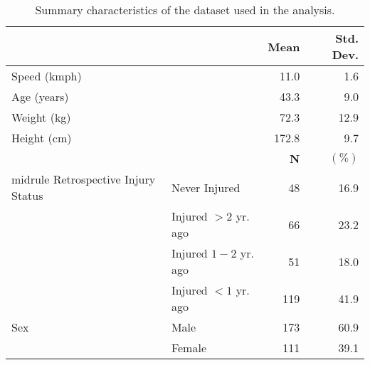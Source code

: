 \begin{table}
\centering
\begin{tabular}[t]{llrr}
\toprule
  &    & \textbf{Mean} & \textbf{Std. Dev.}\\
\midrule
Speed (kmph) &  & 11.0 & 1.6\\
Age (years) &  & 43.3 & 9.0\\
Weight (kg) &  & 72.3 & 12.9\\
Height (cm) &  & 172.8 & 9.7\\
\midrule
 &  & \textbf{N} & $\mathbf{(\%)}$\\
midrule
Retrospective Injury Status & Never Injured & 48 & 16.9\\
 & Injured $>2$ yr. ago & 66 & 23.2\\
 & Injured $1-2$ yr. ago & 51 & 18.0\\
 & Injured $<1$ yr. ago & 119 & 41.9\\
Sex & Male & 173 & 60.9\\
 & Female & 111 & 39.1\\
\bottomrule
\end{tabular}
\caption{Summary characteristics of the dataset used in the analysis.}
\end{table}
